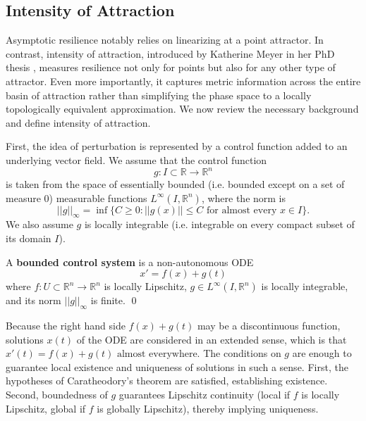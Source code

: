 \subsection{Intensity of Attraction}

Asymptotic resilience notably relies on linearizing at a point attractor. In contrast, intensity of attraction, introduced by Katherine Meyer in her PhD thesis \cite{meyerMetricPropertiesAttractors2019}, measures resilience not only for points but also for any other type of attractor. Even more importantly, it captures metric information across the entire basin of attraction rather than simplifying the phase space to a locally topologically equivalent approximation. We now review the necessary background and define intensity of attraction. 

First, the idea of perturbation is represented by a control function added to an underlying vector field. We assume that the control function $$g: I \subset \mathbb{R} \to \mathbb{R}^n$$ is taken from the space of essentially bounded (i.e. bounded except on a set of measure 0) measurable functions $L^\infty (I,\mathbb{R}^n)$, where the norm is 
$$||g||_\infty = \inf\{C \geq 0  :  ||g(x)|| \leq C  \text{ for almost every } x \in I \}.$$ 
We also assume $g$ is locally integrable (i.e. integrable on every compact subset of its domain $I$). 

\begin{definition}
	A \textbf{bounded control system}  is a non-autonomous ODE 
	\begin{equation}
		\label{eqn:control_ode}x' = f(x) + g(t)
	\end{equation}
	where $f: U \subset \mathbb{R}^n \to \mathbb{R}^n$ is locally Lipschitz, $g \in L^\infty (I,\mathbb{R}^n)$ is locally integrable, and its norm $||g||_\infty$ is finite.  \qed
\end{definition}

Because the right hand side $f(x) + g(t)$ may be a discontinuous function, solutions $x(t)$ of the ODE are considered in an extended sense, which is that $x'(t) = f(x) + g(t) \text{ almost everywhere.}$ The conditions on $g$ are enough to guarantee local existence and uniqueness of solutions in such a sense. First, the hypotheses of Caratheodory's theorem are satisfied, establishing existence. Second, boundedness of $g$ guarantees Lipschitz continuity (local if $f$ is locally Lipschitz, global if $f$ is globally Lipschitz), thereby implying uniqueness. 

